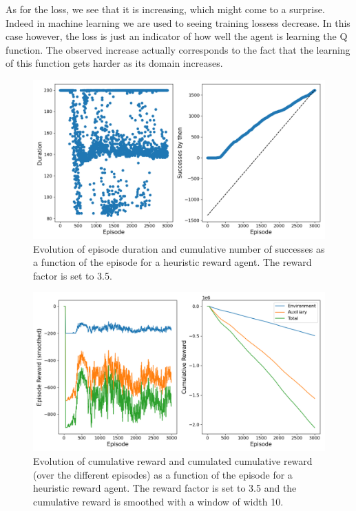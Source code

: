 \documentclass[a4paper, 12pt,oneside]{article}
\begin{document}
        As for the loss, we see that it is increasing, which might come to a surprise. Indeed in machine learning we are used to seeing training lossess decrease. In this case however, the loss is just an indicator of how well the agent is learning the Q function. The observed increase actually corresponds to the fact that the learning of this function gets harder as its domain increases.
        \begin{figure}[h!]
            \centering
            \vspace{0em}
            \includegraphics[width=.75\textwidth]{../runs/dqn_heuristic/up-tau=3_d=2_frac=3.5/figs/duration}
            \caption{Evolution of episode duration and cumulative number of successes as a function of the episode for a heuristic reward agent. The reward factor is set to 3.5.}
            \label{fig:dqn-heuristic-frac=3.5-duration}
        \end{figure}
        \begin{figure}[h!]
            \centering
            \vspace{0em}
            \includegraphics[width=.75\textwidth]{../runs/dqn_heuristic/up-tau=3_d=2_frac=3.5/figs/reward}
            \caption{Evolution of cumulative reward and cumulated cumulative reward (over the different episodes) as a function of the episode for a heuristic reward agent. The reward factor is set to 3.5 and the cumulative reward is smoothed with a window of width 10.}
            \label{fig:dqn-heuristic-frac=3.5-reward}
        \end{figure}
\end{document}
